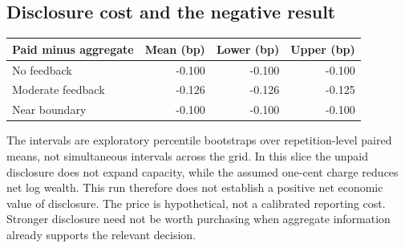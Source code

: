 \documentclass[12pt]{article}
\theoremstyle{definition}
\theoremstyle{remark}
\begin{document}
\subsection*{Disclosure cost and the negative result}
\begin{center}\small
\begin{tabular}{lrrr}
\toprule
Paid minus aggregate & Mean (bp) & Lower (bp) & Upper (bp)\\
\midrule
No feedback & -0.100 & -0.100 & -0.100\\
Moderate feedback & -0.126 & -0.126 & -0.125\\
Near boundary & -0.100 & -0.100 & -0.100\\
\bottomrule
\end{tabular}
\end{center}
The intervals are exploratory percentile bootstraps over repetition-level
paired means, not simultaneous intervals across the grid. In this slice the
unpaid disclosure does not expand capacity, while the assumed one-cent charge
reduces net log wealth. This run therefore does not establish a positive net
economic value of disclosure. The price is hypothetical, not a calibrated
reporting cost. Stronger disclosure need not be worth purchasing when aggregate
information already supports the relevant decision.
\end{document}
